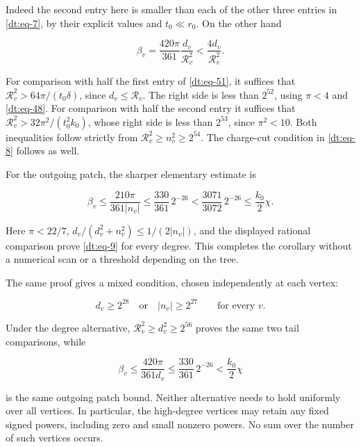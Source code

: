 Indeed the second entry here is smaller than each of the other three
entries in \eqref{dt:eq-7}, by their explicit values and \(t_0\ll r_0\).
On the other hand

\begin{equation}\label{dt:eq-52}
\beta_v=\frac{420\pi}{361}\frac{d_v}{\mathcal R_v^2}
                       <\frac{4d_v}{\mathcal R_v^2}.
\end{equation}

For comparison with half the first entry of \eqref{dt:eq-51}, it suffices that
\(\mathcal R_v^2>64\pi/(t_0\delta)\), since \(d_v\le\mathcal R_v\).
The right side is less than \(2^{52}\), using \(\pi<4\) and \eqref{dt:eq-48}.
For comparison with half the second entry it suffices that
\(\mathcal R_v^2>32\pi^2/(t_0^2k_0)\), whose right side is less
than \(2^{53}\), since \(\pi^2<10\). Both inequalities follow
strictly from \(\mathcal R_v^2\ge n_v^2\ge2^{54}\).
The charge-cut condition in \eqref{dt:eq-8} follows as well.

For the outgoing patch, the sharper elementary estimate is

\begin{equation}\label{dt:eq-53}
\beta_v\le\frac{210\pi}{361|n_v|}
 \le\frac{330}{361}\,2^{-26}
 <\frac{3071}{3072}\,2^{-26}
 \le\frac{k_0}2\chi.
\end{equation}

Here \(\pi<22/7\),
\(d_v/(d_v^2+n_v^2)\le1/(2|n_v|)\), and the displayed rational
comparison prove \eqref{dt:eq-9} for every degree. This completes the corollary
without a numerical scan or a threshold depending on the tree.

The same proof gives a mixed condition, chosen independently at each
vertex:

\begin{equation}\label{dt:eq-53a}
\boxed{\qquad
       d_v\ge2^{28}\quad\text{or}\quad |n_v|\ge2^{27}
               \qquad\text{for every }v.\qquad}
\end{equation}

Under the degree alternative, \(\mathcal R_v^2\ge d_v^2\ge2^{56}\)
proves the same two tail comparisons, while

\begin{equation}\label{dt:eq-53b}
\beta_v\le\frac{420\pi}{361d_v}
             \le\frac{330}{361}\,2^{-26}
                    <\frac{k_0}2\chi
\end{equation}

is the same outgoing patch bound. Neither alternative needs to hold
uniformly over all vertices. In particular, the high-degree vertices
may retain any fixed signed powers, including zero and small nonzero
powers. No sum over the number of such vertices occurs.

